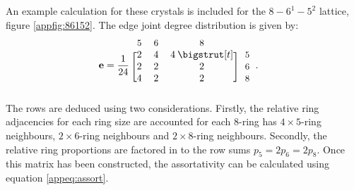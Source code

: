 An example calculation for these crystals is included for the $8 - 6^1 - 5^2$ lattice, figure \ref{appfig:86152}.
The edge joint degree distribution is given by:
\begin{align}
	\mathbf{e} &= \frac{1}{24}\, \begin{blockarray}{*{3}{c} l}
	\begin{block}{*{3}{>{$\footnotesize}c<{$}} l}
	5 & 6 & 8 \\
	\end{block}
	\begin{block}{[*{3}{c}]>{$\footnotesize}l<{$}}
	2 & 4 & 4 \: \bigstrut[t]& 5\\
	2 & 2 & 2 & 6 \\
	4 & 2 & 2 & 8\\
	\end{block}
	\end{blockarray}.
\end{align}
The rows are deduced using two considerations.
Firstly, the relative ring adjacencies for each ring size are accounted for \eg{} each 8\--ring has $4\times5$\--ring neighbours, $2\times6$\--ring neighbours and $2\times8$\--ring neighbours.
Secondly, the relative ring proportions are factored in to the row sums \ie{} $p_5=2p_6=2p_8$.
Once this matrix has been constructed, the assortativity can be calculated using equation \eqref{appeq:assort}.

